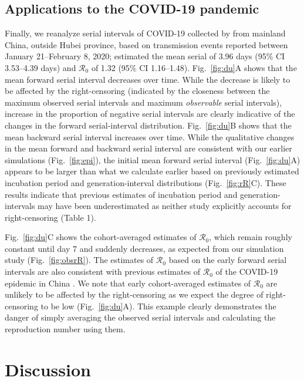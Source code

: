 \documentclass[12pt]{article}
\newcommand{\fref}[1]{Fig.~\ref{fig:#1}}
\begin{document}
\subsection{Applications to the COVID-19 pandemic}

Finally, we reanalyze serial intervals of COVID-19 collected by \cite{du2020serial} from mainland China, outside Hubei province, based on transmission events reported between January 21--February 8, 2020;
\cite{du2020serial} estimated the mean serial of 3.96 days (95\% CI 3.53–4.39 days) and $\mathcal R_0$ of 1.32 (95\% CI 1.16–1.48).
\fref{du}A shows that the mean forward serial interval decreases over time.
While the decrease is likely to be affected by the right-censoring (indicated by the closeness between the maximum observed serial intervals and maximum \emph{observable} serial intervals),  increase in the proportion of negative serial intervals are clearly indicative of the changes in the forward serial-interval distribution.
\fref{du}B shows that the mean backward serial interval increases over time.
While the qualitative changes in the mean forward and backward serial interval are consistent with our earlier simulations (\fref{epi}), the initial mean forward serial interval (\fref{du}A) appears to be larger than what we calculate earlier based on previously estimated incubation period and generation-interval distributions (\fref{rR}C).
These results indicate that previous estimates of incubation period and generation-intervals may have been underestimated as neither study explicitly accounts for right-censoring (Table 1).

\fref{du}C shows the cohort-averaged estimates of $\mathcal R_0$, which remain roughly constant until day 7 and suddenly decreases, as expected from our simulation study (\fref{obsrR}).
The estimates of $\mathcal R_0$ based on the early forward serial intervals are also consistent with previous estimates of $\mathcal R_0$ of the COVID-19 epidemic in China \citep{majumder2020early, park2020reconciling}.
We note that early cohort-averaged estimates of $\mathcal R_0$ are unlikely to be affected by the right-censoring as we expect the degree of right-censoring to be low (\fref{du}A).
This example clearly demonstrates the danger of simply averaging the observed serial intervals and calculating the reproduction number using them.

\section{Discussion}
\end{document}
